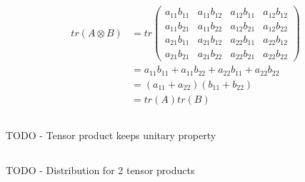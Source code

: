 \documentclass[a4paper,10pt]{hw}
\begin{document}
\begin{align*}
tr\left( A \otimes B \right) &= tr
\begin{pmatrix}
a_{11}b_{11} & a_{11}b_{12} & a_{12}b_{11} & a_{12}b_{12} \\
a_{11}b_{21} & a_{11}b_{22} & a_{12}b_{21} & a_{12}b_{22} \\
a_{21}b_{11} & a_{21}b_{12} & a_{22}b_{11} & a_{22}b_{12} \\
a_{21}b_{21} & a_{21}b_{22} & a_{22}b_{21} & a_{22}b_{22}
\end{pmatrix} \\
&= a_{11}b_{11} + a_{11}b_{22} + a_{22}b_{11} + a_{22}b_{22} \\
&= \left(a_{11} + a_{22}\right) \left(b_{11} + b_{22}\right) \\
&= tr\left(A\right) tr\left(B\right)
\end{align*}
\subsection{}

TODO - Tensor product keeps unitary property

\subsection{}

TODO - Distribution for 2 tensor products
\end{document}
